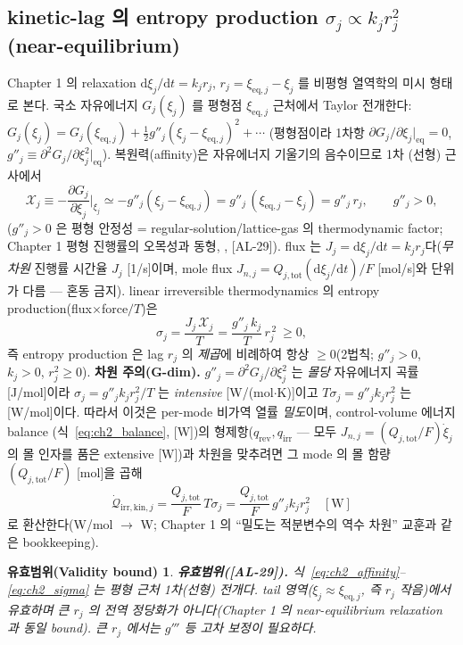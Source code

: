 \documentclass[11pt,a4paper]{article}
\newtheorem*{boundbox}{유효범위(Validity bound)}
\newcommand{\dd}{\mathrm{d}}
\newcommand{\eq}{\mathrm{eq}}
\newcommand{\tot}{\mathrm{tot}}
\newcommand{\irr}{\mathrm{irr}}
\newcommand{\rev}{\mathrm{rev}}
\newcommand{\kin}{\mathrm{kin}}
\newcommand{\AL}[1]{\textsf{[AL-#1]}}
\begin{document}
\subsection{kinetic-lag 의 entropy production $\sigma_j\propto k_j r_j^2$ (near-equilibrium)}\label{sec:ch2_sigma}
Chapter 1 의 relaxation $\dd\xi_j/\dd t=k_j r_j$, $r_j=\xi_{\eq,j}-\xi_j$ 를 비평형 열역학의 미시 형태로 본다.
국소 자유에너지 $G_j(\xi_j)$ 를 평형점 $\xi_{\eq,j}$ 근처에서 Taylor 전개한다: $G_j(\xi_j)=G_j(\xi_{\eq,j})
+\tfrac12 g''_j(\xi_j-\xi_{\eq,j})^2+\cdots$ (평형점이라 1차항 $\partial G_j/\partial\xi_j|_{\eq}=0$,
$g''_j\equiv\partial^2 G_j/\partial\xi_j^2|_{\eq}$). 복원력(affinity)은 자유에너지 기울기의 음수이므로 1차
(선형) 근사에서
\begin{equation}
\mathcal X_j\equiv-\frac{\partial G_j}{\partial\xi_j}\Big|_{\xi_j}\simeq -g''_j(\xi_j-\xi_{\eq,j})=g''_j\,(\xi_{\eq,j}-\xi_j)=g''_j\,r_j,
\qquad g''_j>0,
\label{eq:ch2_affinity}
\end{equation}
($g''_j>0$ 은 평형 안정성 = regular-solution/lattice-gas 의 thermodynamic factor; Chapter 1 평형 진행률의
오목성과 동형, \cite{bazant2013}, \AL{29}). flux 는 $J_j=\dd\xi_j/\dd t=k_j r_j$다(\emph{무차원} 진행률
시간율 $J_j$ [1/s]이며, mole flux $J_{n,j}=Q_{j,\tot}(\dd\xi_j/\dd t)/F$ [mol/s]와 단위가 다름 — 혼동 금지). linear irreversible
thermodynamics 의 entropy production(flux$\times$force$/T$)은 \cite{degrootmazur1962,onsager1931}
\begin{equation}
\boxed{\;\sigma_j=\frac{J_j\,\mathcal X_j}{T}=\frac{g''_j\,k_j}{T}\,r_j^{\,2}\ \ge 0,\;}
\label{eq:ch2_sigma}
\end{equation}
즉 entropy production 은 lag $r_j$ 의 \emph{제곱}에 비례하여 항상 $\ge0$(2법칙; $g''_j>0$, $k_j>0$,
$r_j^2\ge0$). \textbf{차원 주의(G-dim).} $g''_j=\partial^2 G_j/\partial\xi_j^2$ 는 \emph{몰당} 자유에너지 곡률
[J/mol]이라 $\sigma_j=g''_j k_j r_j^2/T$ 는 \emph{intensive} [W/(mol$\cdot$K)]이고 $T\sigma_j=g''_j k_j r_j^2$
는 [W/mol]이다. 따라서 이것은 per-mode 비가역 열률 \emph{밀도}이며, control-volume 에너지 balance
(식~\eqref{eq:ch2_balance}, [W])의 형제항($q_\rev,q_\irr$ — 모두 $J_{n,j}=(Q_{j,\tot}/F)\dot\xi_j$ 의 몰 인자를
품은 extensive [W])과 차원을 맞추려면 그 mode 의 몰 함량 $(Q_{j,\tot}/F)$ [mol]을 곱해
\begin{equation}
\dot{\mathcal Q}_{\irr,\kin,j}=\frac{Q_{j,\tot}}{F}\,T\sigma_j=\frac{Q_{j,\tot}}{F}\,g''_j k_j r_j^2\quad[\mathrm W]
\label{eq:ch2_qirrkin_ext}
\end{equation}
로 환산한다(W/mol $\to$ W; Chapter 1 의 ``밀도는 적분변수의 역수 차원'' 교훈과 같은 bookkeeping).
\begin{boundbox}
\textbf{유효범위(\AL{29}).} 식~\eqref{eq:ch2_affinity}--\eqref{eq:ch2_sigma} 는 평형 근처 1차(선형) 전개다.
tail 영역($\xi_j\approx\xi_{\eq,j}$, 즉 $r_j$ 작음)에서 유효하며 큰 $r_j$ 의 전역 정당화가 아니다(Chapter 1
의 near-equilibrium relaxation 과 동일 bound). 큰 $r_j$ 에서는 $g'''$ 등 고차 보정이 필요하다.
\end{boundbox}
\end{document}
